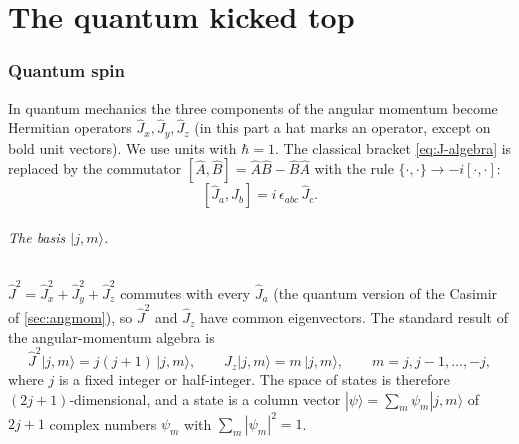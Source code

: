 \documentclass[11pt,a4paper]{article}
\newcommand{\PB}[2]{\{#1,#2\}}
\begin{document}
\part{The quantum kicked top}\label{part:quantum}

\section{Quantum spin}\label{sec:quantum}

In quantum mechanics the three components of the angular momentum become Hermitian operators $\hat J_x, \hat J_y,
\hat J_z$ (in this part a hat marks an operator, except on bold unit vectors). We use units with $\hbar = 1$. The
classical bracket \eqref{eq:J-algebra} is replaced by the commutator $[\hat A, \hat B] = \hat A\hat B - \hat B\hat A$
with the rule $\PB{\cdot}{\cdot} \to -i[\cdot,\cdot]$:
\begin{equation}\label{eq:q-algebra}
  [\hat J_a, \hat J_b] = i\,\epsilon_{abc}\,\hat J_c .
\end{equation}

\paragraph{The basis $|j,m\rangle$.} $\hat J^2 = \hat J_x^2 + \hat J_y^2 + \hat J_z^2$ commutes with every $\hat J_a$
(the quantum version of the Casimir of \cref{sec:angmom}), so $\hat J^2$ and $\hat J_z$ have common eigenvectors.
The standard result of the angular-momentum algebra is
\begin{equation}\label{eq:jm-basis}
  \hat J^2|j,m\rangle = j(j+1)\,|j,m\rangle, \qquad \hat J_z|j,m\rangle = m\,|j,m\rangle, \qquad
  m = j, j-1, \dots, -j,
\end{equation}
where $j$ is a fixed integer or half-integer. The space of states is therefore $(2j+1)$-dimensional, and a state is a
column vector $|\psi\rangle = \sum_m \psi_m|j,m\rangle$ of $2j+1$ complex numbers $\psi_m$ with $\sum_m|\psi_m|^2 = 1$.
\end{document}
